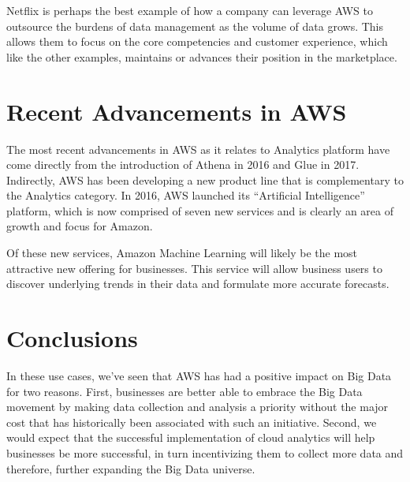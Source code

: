 \documentclass[sigconf]{acmart}
\begin{document}
Netflix is perhaps the best example of how a company can leverage AWS to outsource the burdens of data management as the volume of data grows. This allows them to focus on the core competencies and customer experience, which like the other examples, maintains or advances their position in the marketplace. 

\section{Recent Advancements in AWS}
The most recent advancements in AWS as it relates to Analytics platform have come directly from the introduction of Athena in 2016 and Glue in 2017. Indirectly, AWS has been developing a new product line that is complementary to the Analytics category. In 2016, AWS launched its ``Artificial Intelligence'' platform, which is now comprised of seven new services and is clearly an area of growth and focus for Amazon.

Of these new services, Amazon Machine Learning will likely be the most attractive new offering for businesses. This service will allow business users to discover underlying trends in their data and formulate more accurate forecasts.

\section{Conclusions}
In these use cases, we've seen that AWS has had a positive impact on Big Data for two reasons. First, businesses are better able to embrace the Big Data movement by making data collection and analysis a priority without the major cost that has historically been associated with such an initiative. Second, we would expect that the successful implementation of cloud analytics will help businesses be more successful, in turn incentivizing them to collect more data and therefore, further expanding the Big Data universe.


 


\end{document}
